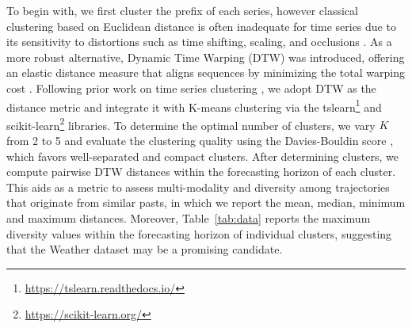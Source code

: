 \documentclass[a4paper,oneside,bibliography=totoc]{scrbook}
\begin{document}
To begin with, we first cluster the prefix of each series, however classical clustering based on Euclidean distance is often inadequate for time series due to its sensitivity to distortions such as time shifting, scaling, and occlusions \cite{paparrizos_k-shape_2015, paparrizos_bridging_2024}. As a more robust alternative, Dynamic Time Warping (DTW) \cite{chu_iterative_2002, sakoe_dynamic_1978} was introduced, offering an elastic distance measure that aligns sequences by minimizing the total warping cost \cite{paparrizos_bridging_2024}.
Following prior work on time series clustering \cite{izakian_fuzzy_2015, anh_efficient_2015, bothwell_pattern-based_2022, li_time_2020}, we adopt DTW as the distance metric and integrate it with K-means clustering
via the tslearn\footnote{\href{https://tslearn.readthedocs.io/}{\url{https://tslearn.readthedocs.io/}}} \cite{tavenard_tslearn_2020} and scikit-learn\footnote{\href{https://scikit-learn.org/}{\url{https://scikit-learn.org/}}} \cite{pedregosa_scikit-learn_2011} libraries. 
To determine the optimal number of clusters, we vary $K$ from 2 to 5 and evaluate the clustering quality using the Davies-Bouldin score \cite{davies_cluster_1979}, which favors well-separated and compact clusters.
After determining clusters, we compute pairwise DTW distances within the forecasting horizon of each cluster. This aids as a metric to assess multi-modality and diversity among trajectories that originate from similar pasts, in which we report the mean, median, minimum and maximum distances. %
Moreover, Table~\ref{tab:data} reports the maximum diversity values within the forecasting horizon of individual clusters, suggesting that the Weather dataset may be a promising candidate.
\end{document}
